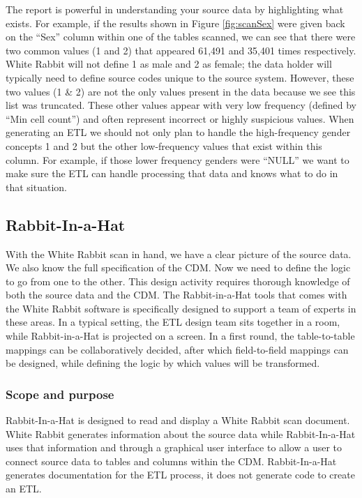 \documentclass[11pt]{book}
\theoremstyle{definition}
\theoremstyle{definition}
\theoremstyle{definition}
\theoremstyle{remark}
\begin{document}
The report is powerful in understanding your source data by highlighting what exists. For example, if the results shown in Figure \ref{fig:scanSex} were given back on the ``Sex'' column within one of the tables scanned, we can see that there were two common values (1 and 2) that appeared 61,491 and 35,401 times respectively. White Rabbit will not define 1 as male and 2 as female; the data holder will typically need to define source codes unique to the source system. However, these two values (1 \& 2) are not the only values present in the data because we see this list was truncated. These other values appear with very low frequency (defined by ``Min cell count'') and often represent incorrect or highly suspicious values. When generating an ETL we should not only plan to handle the high-frequency gender concepts 1 and 2 but the other low-frequency values that exist within this column. For example, if those lower frequency genders were ``NULL'' we want to make sure the ETL can handle processing that data and knows what to do in that situation.

\hypertarget{rabbit-in-a-hat}{%
\subsection{Rabbit-In-a-Hat}\label{rabbit-in-a-hat}}

With the White Rabbit scan in hand, we have a clear picture of the source data. We also know the full specification of the CDM. Now we need to define the logic to go from one to the other. This design activity requires thorough knowledge of both the source data and the CDM. The Rabbit-in-a-Hat tools that comes with the White Rabbit software is specifically designed to support a team of experts in these areas. In a typical setting, the ETL design team sits together in a room, while Rabbit-in-a-Hat is projected on a screen. In a first round, the table-to-table mappings can be collaboratively decided, after which field-to-field mappings can be designed, while defining the logic by which values will be transformed.  

\hypertarget{scope-and-purpose-1}{%
\subsubsection*{Scope and purpose}\label{scope-and-purpose-1}}

Rabbit-In-a-Hat is designed to read and display a White Rabbit scan document. White Rabbit generates information about the source data while Rabbit-In-a-Hat uses that information and through a graphical user interface to allow a user to connect source data to tables and columns within the CDM. Rabbit-In-a-Hat generates documentation for the ETL process, it does not generate code to create an ETL.
\end{document}
